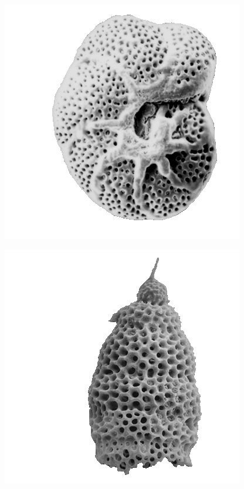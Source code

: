 \documentclass{beamer}
\begin{document}
\begin{frame}
\begin{columns}
\begin{column}{0.1\textwidth}
\begin{center}
        \includegraphics[width=\textwidth,height=0.15\textheight,keepaspectratio=true]{figure/foram}

        \includegraphics[width=\textwidth,height=0.15\textheight,keepaspectratio=true]{figure/rad}


\end{center}
\end{column}
\end{columns}
\end{frame}
\end{document}
